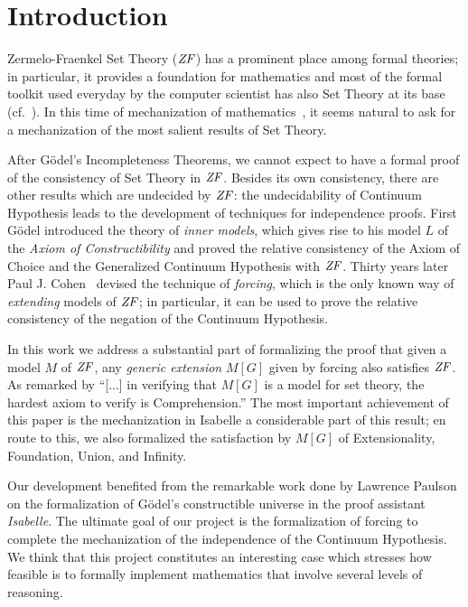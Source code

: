 \section{Introduction}
Zermelo-Fraenkel Set Theory ($\mathit{ZF}$) has a prominent place among formal
theories; in particular, it provides a foundation for mathematics and
most of the formal toolkit used everyday by the computer scientist has
also Set Theory at its base (cf.~\cite{paulson1995set}). In this time
of mechanization of mathematics~\cite{avigad2018mechanization}, it
seems natural to ask for a mechanization of the most salient results
of Set Theory.

After G\"odel's Incompleteness Theorems, we cannot expect to have a
formal proof of the consistency of Set Theory in $\mathit{ZF}$. Besides its own
consistency, there are other results which are undecided by $\mathit{ZF}$: the
undecidability of Continuum Hypothesis leads to the development of
techniques for independence proofs. First G\"odel introduced the
theory of \emph{inner models}, which gives rise to his model $L$ of
the \emph{Axiom of Constructibility} \cite{godel-L} and proved the
relative consistency of the Axiom of Choice and the Generalized
Continuum Hypothesis with $\mathit{ZF}$. Thirty years later Paul
J. Cohen~\cite{Cohen-CH-PNAS} devised the technique of \emph{forcing},
which is the only known way of \emph{extending} models of $\mathit{ZF}$; in
particular, it can be used to prove the relative consistency of the
negation of the Continuum Hypothesis. 

In this work we address a substantial part of formalizing the proof
that given a model $M$ of $\mathit{ZF}$, any \emph{generic extension} $M[G]$
given by forcing also satisfies $\mathit{ZF}$. As remarked by
\citet[][p.250]{kunen2011set} \enquote{[...] in verifying that $M[G]$
  is a model for set theory, the hardest axiom to verify is
  Comprehension.}  The most important achievement of this paper is the
mechanization in Isabelle a considerable part of this result; en route
to this, we also formalized the satisfaction by $M[G]$ of
Extensionality, Foundation, Union, and Infinity.

Our development benefited from the remarkable work done by Lawrence
Paulson \cite{paulson_2003} on the formalization of G\"odel's
constructible universe in the proof assistant \emph{Isabelle}. The
ultimate goal of our project is the formalization of forcing to
complete the mechanization of the independence of the Continuum
Hypothesis. We think that this project constitutes an interesting case
which stresses how feasible is to formally implement mathematics that
involve several levels of reasoning.

